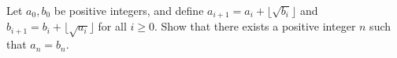 Let $a_0,b_0$ be positive integers, and define $a_{i+1}=a_i+\lfloor\sqrt{b_i}\rfloor$ and $b_{i+1}=b_i+\lfloor\sqrt{a_i}\rfloor$ for all $i\ge0$. Show that there exists a positive integer $n$ such that $a_n=b_n$.